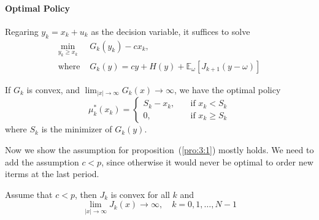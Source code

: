 \paragraph{Optimal Policy}
Regaring $y_k = x_k+u_k$ as the decision variable, it suffices to solve
\[
\begin{array}{ll}
\min_{y_k\ge x_k}&G_k(y_k) - cx_k,\\
\text{where }&G_k(y)
=cy+H(y)+\mathbb{E}_{\omega}\left[J_{k+1}(y-\omega)\right]
\end{array}
\]
\begin{proposition}\label{pro:3:1}
If $G_k$ is convex, and $\lim_{|x|\to\infty}G_k(x)\to\infty$, we have the optimal policy
\[
\mu_k^*(x_k) = \left\{
\begin{aligned}
S_k-x_k,\quad&\text{if }x_k<S_k\\
0,\quad&\text{if }x_k\ge S_k
\end{aligned}
\right.
\]
where $S_k$ is the minimizer of $G_k(y)$.
\end{proposition}
Now we show the assumption for proposition~(\ref{pro:3:1}) mostly holds. We need to add the assumption $c<p$, since otherwise it would never be optimal to order new iterms at the last period.
\begin{proposition}
Assume that $c<p$, then $J_k$ is convex for all $k$ and 
\[
\lim_{|x|\to\infty}J_k(x)\to\infty,\quad k=0,1,\dots,N-1
\]
\end{proposition}

